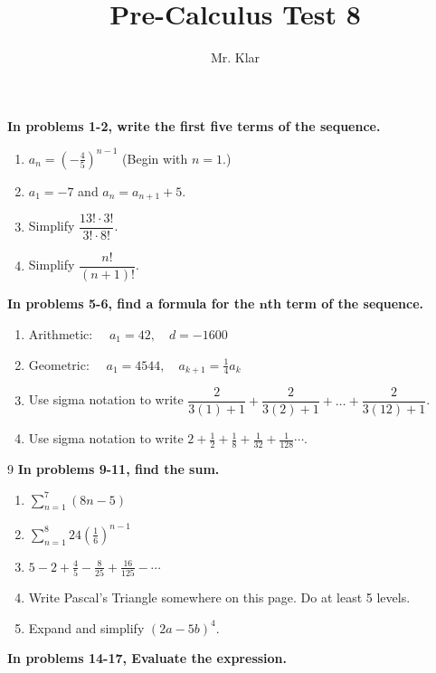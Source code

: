 \documentclass[letterpaper]{article}
\title{Pre-Calculus \linebreak
Test 8}
\author{Mr. Klar}
\date{}
\begin{document}

\maketitle

\noindent	\textbf{In problems 1-2, write the first five terms of the sequence.}
\begin{enumerate}
	\item $a_n = \left(-\frac{4}{5}\right)^{n-1}$ (Begin with $n=1$.)
	\item $a_1 = -7$ and $a_n=a_{n+1}+5$. 
  \item Simplify $\dfrac{13! \cdot 3!}{3!\cdot8!}$. 
  \item Simplify $\dfrac{n!}{(n+1)!}$. 
\end{enumerate}
\noindent	\textbf{In problems 5-6, find a formula for the $\bm{n}$th term of the sequence.}
\begin{enumerate}[resume]
	\item Arithmetic: $ \quad a_1=42, \quad d = -1600$
	\item Geometric: $\quad a_1 = 4544, \quad a_{k+1}=\frac{1}{4}a_k$
	\item Use sigma notation to write $\dfrac{2}{3(1)+1}+\dfrac{2}{3(2)+1}+\dots+\dfrac{2}{3(12)+1}$.
	\item Use sigma notation to write $2+\frac{1}{2}+\frac{1}{8}+\frac{1}{32}+\frac{1}{128}\cdots$.
\end{enumerate}9
\noindent	\textbf{In problems 9-11, find the sum.}
\begin{enumerate}[resume]
	\item $\displaystyle\sum_{n=1}^7(8n-5)$
	\item $\displaystyle\sum_{n=1}^8 24\left(\tfrac{1}{6}\right)^{n-1}$
	\item $5-2+\frac{4}{5}-\frac{8}{25}+\frac{16}{125}-\cdots$
	\item Write Pascal's Triangle somewhere on this page. Do at least 5 levels.
	\item Expand and simplify $(2a-5b)^4$. 
\end{enumerate}
\noindent	\textbf{In problems 14-17, Evaluate the expression.}
\end{document}
